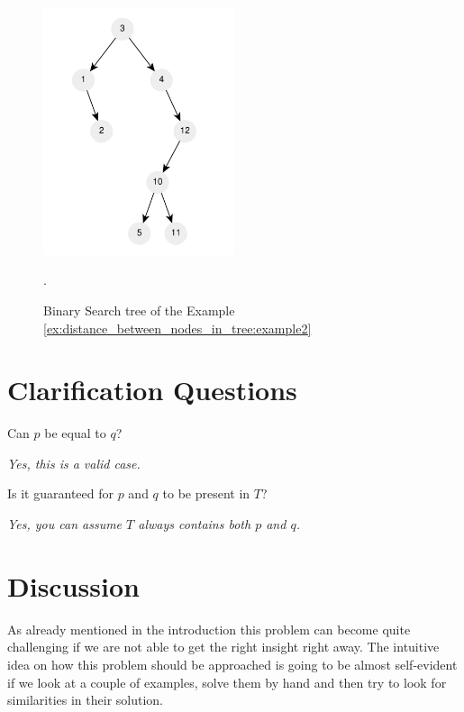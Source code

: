 \begin{figure}
	\centering
	\includegraphics[width=0.5\textwidth]{sources/distance_between_nodes_in_tree/images/example2}
	\caption{Binary Search tree of the Example
	\ref{ex:distance_between_nodes_in_tree:example2}}.
	\label{fig:distance_between_nodes_in_tree:example2}
\end{figure}

\section{Clarification Questions}

\begin{QandA}
	\item Can $p$ be equal to $q$?
	\begin{answered}
		\textit{Yes, this is a valid case.}
	\end{answered}
	
	\item Is it guaranteed for  $p$ and  $q$ to be present in $T$?
	\begin{answered}
		\textit{Yes, you can assume $T$ always contains both $p$ and $q$.}
	\end{answered}

\end{QandA}

\section{Discussion}
\label{distance_between_nodes_in_tree:sec:discussion}
As already mentioned in the introduction this problem can become quite challenging if we are not able to get the right insight right away. The intuitive idea on how this problem should be approached is going to be
almost self-evident if we look at a couple of examples, solve them by hand and then try to look for similarities in their solution.

